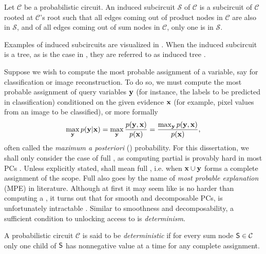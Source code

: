 \begin{definition}\label{def:inducedsub}
  Let $\mathcal{C}$ be a probabilistic circuit. An induced subcircuit $\mathcal{S}$ of $\mathcal{C}$
  is a subcircuit of $\mathcal{C}$ rooted at $\mathcal{C}$'s root such that all edges coming out of
  product nodes in $\mathcal{C}$ are also in $\mathcal{S}$, and of all edges coming out of sum
  nodes in $\mathcal{C}$, only one is in $\mathcal{S}$.
\end{definition}

Examples of induced subcircuits are visualized in . When the induced subcircuit
is a tree, as is the case in , they are referred to as induced tree
\citep{zhao15,zhao16b}.

Suppose we wish to compute the most probable assignment of a variable, say for classification or
image reconstruction. To do so, we must compute the most probable assignment of query variables
$\mathbf{y}$ (for instance, the labels to be predicted in classification) conditioned on the given
evidence $\mathbf{x}$ (for example, pixel values from an image to be classified), or more formally
\begin{equation}
  \max_{\mathbf{y}}p(\mathbf{y}|\mathbf{x})=\max_{\mathbf{y}}\frac{p(\mathbf{y},\mathbf{x})}{p(\mathbf{x})}=
  \frac{\max_{\mathbf{y}}p(\mathbf{y},\mathbf{x})}{p(\mathbf{x})},
  \label{eq:map}
\end{equation}
often called the \emph{maximum a posteriori} (\map) probability. For this dissertation, we shall
only consider the case of full \map{}, as computing partial \map{} is provably hard in most PCs
\citep{peharz16,decampos11}.  Unless explicitly stated, \map{} shall mean full \map{}, i.e. when
$\mathbf{x}\cup\mathbf{y}$ forms a complete assignment of the scope. Full \map{} also goes by the name of
\emph{most probable explanation} (MPE) in literature.  Although at first it may seem like \map{} is
no harder than computing a \con{}, it turns out that for smooth and decomposable PCs, \map{} is
unfortunately intractable \citep{conaty17,mei18}. Similar to smoothness and decomposability, a
sufficient condition to unlocking access to \map{} is \emph{determinism}.

\begin{definition}[Determinism]
  A probabilistic circuit $\mathcal{C}$ is said to be \emph{deterministic} if for every sum node
  $\operatorname{\textup{\textsf{S}}}\in\mathcal{C}$ only one child of $\operatorname{\textup{\textsf{S}}}$ has nonnegative value at a time for any complete
  assignment.
\end{definition}

